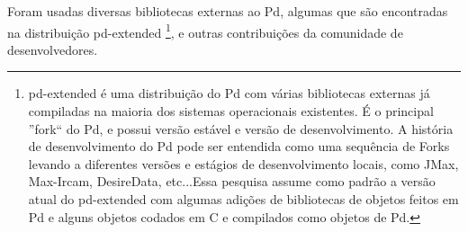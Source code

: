\documentclass{ppgmus}
\begin{document}
Foram usadas diversas bibliotecas externas ao Pd, algumas que são encontradas na distribuição pd-extended
\footnote{pd-extended é uma distribuição do Pd com várias bibliotecas externas já compiladas na maioria dos
sistemas operacionais existentes. É o principal ''fork`` do Pd, e possui versão estável e versão de desenvolvimento.
A história de desenvolvimento do Pd pode ser entendida como uma sequência de Forks levando a diferentes versões 
e estágios de desenvolvimento locais, como JMax, Max-Ircam, DesireData, etc...Essa pesquisa assume como padrão
a versão atual do pd-extended com algumas adições de bibliotecas de objetos feitos em Pd e alguns objetos codados
em C e compilados como objetos de Pd.}, 
e outras contribuições da comunidade de desenvolvedores.

% 
% 
% 
\end{document}
